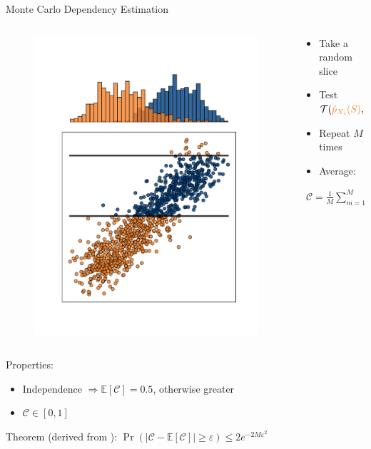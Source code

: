 \documentclass[16pt,usenames,dvipsnames, notheorems]{beamer}
\theoremstyle{definition}
\theoremstyle{example}
\theoremstyle{plain}
\begin{document}
\begin{frame}{Monte Carlo Dependency Estimation}
\begin{columns}
\begin{column}{0.6\textwidth}
\begin{figure}
\begin{overprint}
				\includegraphics[trim=1cm 1cm 1cm 1cm, width=0.49\linewidth]{figures/linear_2D_4_nomarginal-compressed.pdf}
			\end{overprint}
		\end{figure}
	\end{column}
	\pause
	\begin{column}{0.42\textwidth} 
		\begin{itemize}
			\item Take a random slice
			\pause
			\item Test $\mathcal{T}(\textcolor{specialorange}{\hat{p}_{X_i}(S)},\textcolor{specialblue}{\hat{p}(S|\overline{X_i})})$
			\pause
			\item Repeat $M$ times
			\pause
			\item Average: 
		\end{itemize}
		\pause
		\begin{align*}
		\mathcal{C} = \frac{1}{M} \sum^{M}_{m=1} ( 1- p\text{-}value) 
		\end{align*}
	\end{column}
\end{columns}
\pause
Properties: 
\begin{itemize}
	\item Independence $\Rightarrow \mathbb{E}[\mathcal{C}] = 0.5$, otherwise greater
	\item $\mathcal{C} \in [0,1]$
\end{itemize}
\pause
Theorem (derived from \cite{doi:10.1080/01621459.1963.10500830}): $\Pr\left(| \mathcal{C} - \mathbb{E}[\mathcal{C}] | \geq \varepsilon \right) \leq 2e^{-2M \varepsilon^2}$

~\\

\end{frame}
\end{document}
